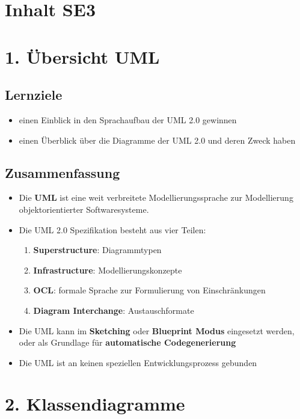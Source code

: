 \section{Inhalt SE3}

\section*{1. Übersicht UML}

\subsection*{Lernziele}
\begin{itemize}
    \item einen Einblick in den Sprachaufbau der UML 2.0 gewinnen
    \item einen Überblick über die Diagramme der UML 2.0 und deren Zweck haben
\end{itemize}

\subsection*{Zusammenfassung}
\begin{itemize}
    \item Die \textbf{UML} ist eine weit verbreitete Modellierungssprache zur Modellierung objektorientierter Softwaresysteme.
    \item Die UML 2.0 Spezifikation besteht aus vier Teilen:
    \begin{enumerate}
        \item \textbf{Superstructure}: Diagrammtypen
        \item \textbf{Infrastructure}: Modellierungskonzepte
        \item \textbf{OCL}: formale Sprache zur Formulierung von Einschränkungen
        \item \textbf{Diagram Interchange}: Austauschformate
    \end{enumerate}
    \item Die UML kann im \textbf{Sketching} oder \textbf{Blueprint Modus} eingesetzt werden, oder als Grundlage für \textbf{automatische Codegenerierung}
    \item Die UML ist an keinen speziellen Entwicklungsprozess gebunden
\end{itemize}

\section*{2. Klassendiagramme}

